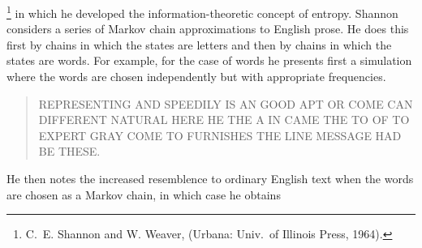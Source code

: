 \footnote{C.~E.
Shannon and W. Weaver,  (Urbana:
Univ.\ of
Illinois Press, 1964).} in which he developed the informa\-tion-theoretic
concept 
of entropy.  Shannon considers a series of Markov chain approximations to
English
prose.  He does this first by chains in which the states are letters and then
by chains in which the states are words.  For example, for the case of words he
presents first a simulation where the words are chosen independently but with
appropriate frequencies.
\par
\begin{quote}
REPRESENTING AND SPEEDILY IS AN GOOD APT OR COME CAN DIFFERENT NATURAL HERE HE
THE A IN CAME THE TO OF TO EXPERT GRAY COME TO FURNISHES THE LINE MESSAGE HAD
BE THESE.
\end{quote}
\par
He then notes the increased resemblence to ordinary English text when the words
are chosen as a Markov chain, in which case he obtains
 

